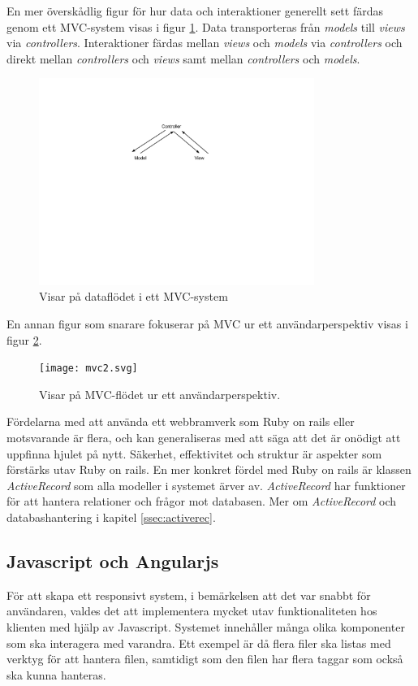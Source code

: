 \documentclass[a4paper,12pt,oneside,final]{extbook}
\begin{document}
En mer överskådlig figur för hur data och interaktioner generellt sett färdas genom ett MVC-system visas i figur \ref{fig:mvc1}. Data transporteras från \textit{models} till \textit{views} via \textit{controllers}. Interaktioner färdas mellan \textit{views} och \textit{models} via \textit{controllers} och direkt mellan \textit{controllers} och \textit{views} samt mellan \textit{controllers} och \textit{models}.

\begin{figure}[!H]
\centering
\includegraphics[width=0.8\textwidth]{mvc1.png}
\caption{Visar på dataflödet i ett MVC-system}
\label{fig:mvc1}
\end{figure}

En annan figur som snarare fokuserar på MVC ur ett användarperspektiv visas i figur \ref{fig:mvc2}.

\begin{figure}[!H]
\centering
\texttt{[image: mvc2.svg]}
\caption{Visar på MVC-flödet ur ett användarperspektiv.}
\label{fig:mvc2}
\end{figure}

Fördelarna med att använda ett webbramverk som Ruby on rails eller motsvarande är flera, och kan generaliseras med att säga att det är onödigt att uppfinna hjulet på nytt. Säkerhet, effektivitet och struktur är aspekter som förstärks utav Ruby on rails. En mer konkret fördel med Ruby on rails är klassen \emph{ActiveRecord} som alla modeller i systemet ärver av. \emph{ActiveRecord} har funktioner för att hantera relationer och frågor mot databasen. Mer om \emph{ActiveRecord} och databashantering i kapitel \ref{ssec:activerec}.

\subsection{Javascript och Angularjs}
För att skapa ett responsivt system, i bemärkelsen att det var snabbt för användaren, valdes det att implementera mycket utav funktionaliteten hos klienten med hjälp av Javascript. Systemet innehåller många olika komponenter som ska interagera med varandra. Ett exempel är då flera filer ska listas med verktyg för att hantera filen, samtidigt som den filen har flera taggar som också ska kunna hanteras. 
\end{document}
